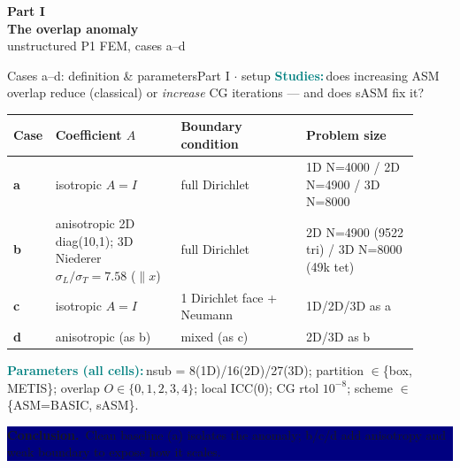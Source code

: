 \documentclass[aspectratio=169,9pt]{beamer}
\newcommand{\spec}[2]{\textcolor{teal}{\textbf{#1}}\,#2\par\smallskip}
\newcommand{\concl}[1]{\vfill\noindent\colorbox{navy}{\parbox{\dimexpr\textwidth-2\fboxsep\relax}{\color{white}\footnotesize\textbf{Conclusion.}\ #1}}}
\begin{document}
{\begin{frame}[plain]\centering\vfill
 {\color{amber}\Large\textbf{Part I}}\\[0.3em]{\color{white}\LARGE\bfseries The overlap anomaly}\\[0.4em]
 {\color{white!80!teal} unstructured P1 FEM, cases a–d}\vfill\end{frame}}

\begin{frame}{Cases a–d: definition \& parameters}{Part I $\cdot$ setup}
  \footnotesize
  \spec{Studies:}{does increasing ASM overlap reduce (classical) or \emph{increase} CG iterations — and does sASM fix it?}
  \renewcommand{\arraystretch}{1.25}
  \begin{tabular}{@{}p{0.04\linewidth} p{0.30\linewidth} p{0.30\linewidth} p{0.27\linewidth}@{}}
  \toprule
  \rowcolor{navy}\color{white}\textbf{Case}&\color{white}\textbf{Coefficient $A$}&\color{white}\textbf{Boundary condition}&\color{white}\textbf{Problem size}\\
  \midrule
  \textcolor{asm}{\textbf{a}}& isotropic $A{=}I$ & full Dirichlet & 1D N=4000 / 2D N=4900 / 3D N=8000\\
  \textcolor{asm}{\textbf{b}}& anisotropic 2D diag(10,1); 3D Niederer $\sigma_L/\sigma_T{=}7.58$ ($\parallel x$) & full Dirichlet & 2D N=4900 (9522 tri) / 3D N=8000 (49k tet)\\
  \textcolor{asm}{\textbf{c}}& isotropic $A{=}I$ & 1 Dirichlet face + Neumann & 1D/2D/3D as a\\
  \textcolor{asm}{\textbf{d}}& anisotropic (as b) & mixed (as c) & 2D/3D as b\\
  \bottomrule
  \end{tabular}\smallskip

  \spec{Parameters (all cells):}{nsub = 8(1D)/16(2D)/27(3D); partition $\in$\{box, METIS\}; overlap $O\in\{0,1,2,3,4\}$; local ICC(0); CG rtol $10^{-8}$; scheme $\in$\{ASM=BASIC, sASM\}.}
  \concl{Clean baseline (a) isolates the anomaly; b/c/d add anisotropy and weak boundary to expose how it scales.}
\end{frame}
\end{document}
